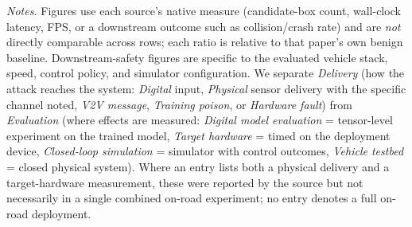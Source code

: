 \documentclass[acmsmall,screen,review,nonacm]{acmart}
\begin{document}
\begin{table}[htbp]
  {\footnotesize\par\vspace{2pt}\emph{Notes.} Figures use each source's native measure (candidate-box count, wall-clock latency, FPS, or a downstream outcome such as collision/crash rate) and are \emph{not} directly comparable across rows; each ratio is relative to that paper's own benign baseline. Downstream-safety figures are specific to the evaluated vehicle stack, speed, control policy, and simulator configuration. We separate \emph{Delivery} (how the attack reaches the system: \emph{Digital} input, \emph{Physical} sensor delivery with the specific channel noted, \emph{V2V message}, \emph{Training poison}, or \emph{Hardware fault}) from \emph{Evaluation} (where effects are measured: \emph{Digital model evaluation} = tensor-level experiment on the trained model, \emph{Target hardware} = timed on the deployment device, \emph{Closed-loop simulation} = simulator with control outcomes, \emph{Vehicle testbed} = closed physical system). Where an entry lists both a physical delivery and a target-hardware measurement, these were reported by the source but not necessarily in a single combined on-road experiment; no entry denotes a full on-road deployment.\par}
\end{table}
\end{document}
